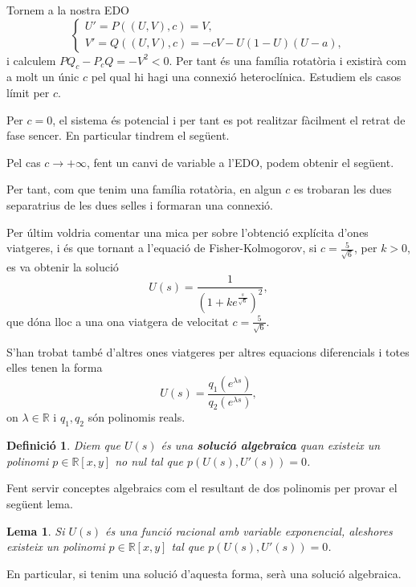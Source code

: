 \documentclass{article}
\newtheorem{lema}{Lema}
\newtheorem{definicio}{Definici\'{o}}
\theoremstyle{definition}
\begin{document}
Tornem a la nostra EDO
\[\left\{\begin{array}{l}U'=P((U,V),c)=V,\\V'=Q((U,V),c)=-cV-U(1-U)(U-a),\end{array}\right.\]
i calculem $PQ_c-P_cQ=-V^2<0$. Per tant \'{e}s una fam\'{i}lia rotat\`{o}ria i existir\`{a} com a molt un \'{u}nic $c$ pel qual hi hagi una connexi\'{o} heterocl\'{i}nica. Estudiem els casos l\'{i}mit per $c$.

Per $c=0$, el sistema \'{e}s potencial i per tant es pot realitzar f\`{a}cilment el retrat de fase sencer. En particular tindrem el seg\"{u}ent.

Pel cas $c\to+\infty$, fent un canvi de variable a l'EDO, podem obtenir el seg\"{u}ent.

Per tant, com que tenim una fam\'{i}lia rotat\`{o}ria, en algun $c$ es trobaran les dues separatrius de les dues selles i formaran una connexi\'{o}.

Per \'{u}ltim voldria comentar una mica per sobre l'obtenci\'{o} expl\'{i}cita d'ones viatgeres, i \'{e}s que tornant a l'equaci\'{o} de Fisher-Kolmogorov, si $c=\frac{5}{\sqrt{6}}$, per $k>0$, es va obtenir la soluci\'{o}
\[U(s)=\frac{1}{\left(1+ke^{\frac{s}{\sqrt{6}}}\right)^2},\]
que d\'{o}na lloc a una ona viatgera de velocitat $c=\frac{5}{\sqrt{6}}$.

S'han trobat tamb\'{e} d'altres ones viatgeres per altres equacions diferencials i totes elles tenen la forma
\[U(s)=\frac{q_1(e^{\lambda s})}{q_2(e^{\lambda s})},\]
on $\lambda\in\mathbb{R}$ i $q_1,q_2$ s\'{o}n polinomis reals.

\begin{definicio}
Diem que $U(s)$ \'{e}s una \textbf{soluci\'{o} algebraica} quan existeix un polinomi $p\in\mathbb{R}[x,y]$ no nul tal que $p(U(s),U'(s))=0$.
\end{definicio}

Fent servir conceptes algebraics com el resultant de dos polinomis per provar el seg\"{u}ent lema.

\begin{lema}
Si $U(s)$ \'{e}s una funci\'{o} racional amb variable exponencial, aleshores existeix un polinomi $p\in\mathbb{R}[x,y]$ tal que $p(U(s),U'(s))=0$.
\end{lema}

En particular, si tenim una soluci\'{o} d'aquesta forma, ser\`{a} una soluci\'{o} algebraica.
\end{document}
